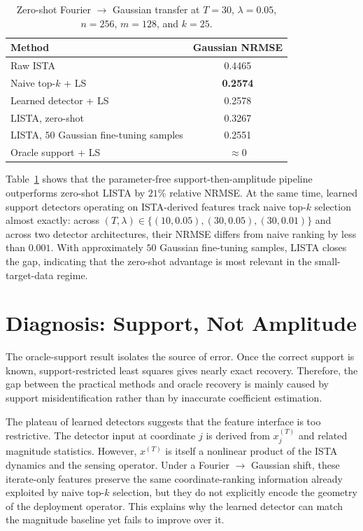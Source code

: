 \documentclass[conference,10pt]{IEEEtran}
\begin{document}
\begin{table}[t]
\centering
\caption{Zero-shot Fourier $\to$ Gaussian transfer at $T=30$,
$\lambda=0.05$, $n=256$, $m=128$, and $k=25$.}
\label{tab:main}
\vspace{-4pt}
\begin{tabular}{lc}
\toprule
\textbf{Method} & \textbf{Gaussian NRMSE} \\
\midrule
Raw ISTA                                  & 0.4465 \\
Naive top-$k$ + LS                        & \textbf{0.2574} \\
Learned detector + LS                     & 0.2578 \\
LISTA, zero-shot                          & 0.3267 \\
LISTA, $50$ Gaussian fine-tuning samples  & 0.2551 \\
Oracle support + LS                       & $\approx 0$ \\
\bottomrule
\end{tabular}
\vspace{-6pt}
\end{table}

Table~\ref{tab:main} shows that the parameter-free support-then-amplitude
pipeline outperforms zero-shot LISTA by $21\%$ relative NRMSE. At the
same time, learned support detectors operating on ISTA-derived features
track naive top-$k$ selection almost exactly: across
$(T,\lambda) \in \{(10,0.05),(30,0.05),(30,0.01)\}$ and across two
detector architectures, their NRMSE differs from naive ranking by less
than $0.001$. With approximately $50$ Gaussian fine-tuning samples, LISTA
closes the gap, indicating that the zero-shot advantage is most relevant
in the small-target-data regime.

\section{Diagnosis: Support, Not Amplitude}

The oracle-support result isolates the source of error. Once the correct
support is known, support-restricted least squares gives nearly exact
recovery. Therefore, the gap between the practical methods and oracle
recovery is mainly caused by support misidentification rather than by
inaccurate coefficient estimation.

The plateau of learned detectors suggests that the feature interface is
too restrictive. The detector input at coordinate $j$ is derived from
$x^{(T)}_j$ and related magnitude statistics. However, $x^{(T)}$ is itself
a nonlinear product of the ISTA dynamics and the sensing operator. Under a
Fourier $\to$ Gaussian shift, these iterate-only features preserve the
same coordinate-ranking information already exploited by naive top-$k$
selection, but they do not explicitly encode the geometry of the
deployment operator. This explains why the learned detector can match the
magnitude baseline yet fails to improve over it.
\end{document}
